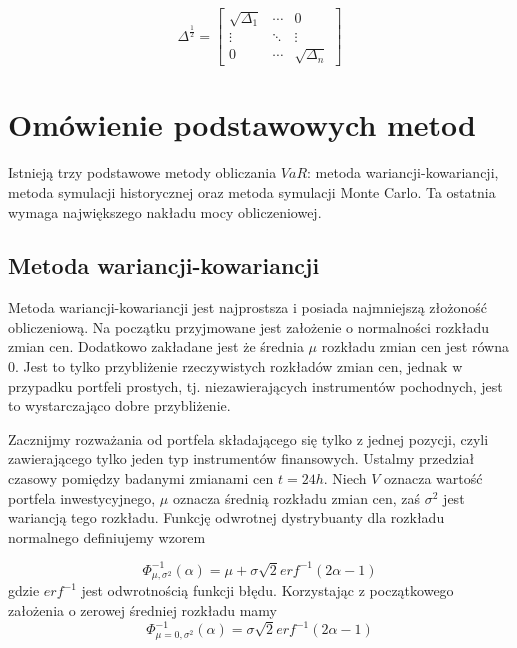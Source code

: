\documentclass[11pt,titlepage]{article}
\numberwithin{equation}{section}
\begin{document}
\begin{equation}
\Delta^{\frac{1}{2}}=\begin{bmatrix} \sqrt{\Delta_1} &  \cdots &0 \\
\vdots & \ddots  & \vdots \\ 0& \cdots & \sqrt{\Delta_n} \end{bmatrix}
\end{equation} 






















\newpage
\section{Omówienie podstawowych metod}
Istnieją trzy podstawowe metody obliczania $VaR$: metoda wariancji-kowariancji, metoda symulacji historycznej oraz metoda symulacji Monte Carlo. Ta ostatnia wymaga największego nakładu mocy obliczeniowej.



\subsection{Metoda wariancji-kowariancji}


Metoda wariancji-kowariancji jest najprostsza i posiada najmniejszą złożoność obliczeniową. Na początku przyjmowane jest założenie o normalności rozkładu zmian cen. Dodatkowo zakładane jest że średnia $\mu$ rozkładu zmian cen jest równa 0. Jest to tylko przybliżenie rzeczywistych rozkładów zmian cen, jednak w przypadku portfeli prostych, tj. niezawierających instrumentów pochodnych, jest to wystarczająco dobre przybliżenie. 

Zacznijmy rozważania od portfela składającego się tylko z jednej pozycji, czyli zawierającego tylko jeden typ instrumentów finansowych. Ustalmy przedział czasowy pomiędzy badanymi zmianami cen $t=24h$. Niech $V$ oznacza wartość portfela inwestycyjnego, $\mu$ oznacza średnią rozkładu zmian cen, zaś $\sigma^{2}$ jest wariancją tego rozkładu. Funkcję odwrotnej dystrybuanty dla rozkładu normalnego definiujemy wzorem 




\begin{equation} 
\Phi_{\mu,\sigma^{2}}^{-1}(\alpha)=\mu+\sigma \sqrt{2} erf^{-1}(2\alpha-1)
\end{equation} 
gdzie $erf^{-1}$ jest odwrotnością funkcji błędu. Korzystając z początkowego założenia o zerowej średniej rozkładu mamy
$$\Phi_{\mu=0,\sigma^{2}}^{-1}(\alpha)=\sigma \sqrt{2} erf^{-1}(2\alpha-1)$$
\end{document}
